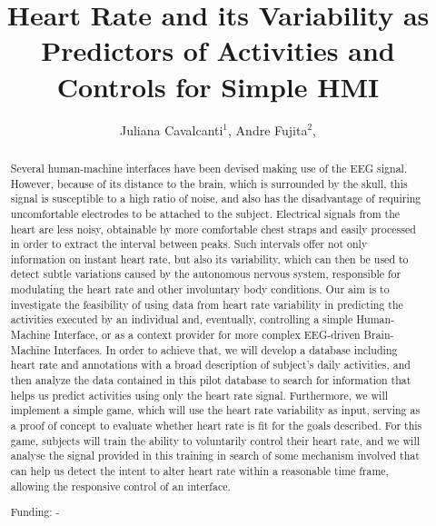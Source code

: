 \documentclass[twoside]{article}
\title{\vspace{-15mm}\fontsize{24pt}{10pt}\selectfont\textbf{ Heart Rate and its Variability as Predictors of Activities and Controls for Simple HMI }} %
\author{ Juliana Cavalcanti$^{1}$, Andre Fujita$^{2}$, }
\affil{ 1 Universidade de São Paulo

2 IME - USP

 }
\date{}
\begin{document}
  
  
  \maketitle %
  
  
  \thispagestyle{fancy} %
  
  
  \begin{abstract}
  Several human-machine interfaces have been devised making use of the EEG signal. However, because of its distance to the brain, which is surrounded by the skull, this signal is susceptible to a high ratio of noise, and also has the disadvantage of requiring uncomfortable electrodes to be attached to the subject.  Electrical signals from the heart are less noisy, obtainable by more comfortable chest straps and easily processed in order to extract the interval between peaks. Such intervals offer not only information on instant heart rate, but also its variability, which can then be used to detect subtle variations caused by the autonomous nervous system, responsible for modulating the heart rate and other involuntary body conditions. Our aim is to investigate the feasibility of using data from heart rate variability in predicting the activities executed by an individual and, eventually, controlling a simple Human-Machine Interface, or as a context provider for more complex EEG-driven Brain-Machine Interfaces.
In order to achieve that, we will develop a database including heart rate and annotations with a broad description of subject's daily activities, and then analyze the data contained in this pilot database to search for information that helps us predict activities using only the heart rate signal. Furthermore, we will implement a simple game, which will use the heart rate variability as input, serving as a proof of concept to evaluate whether heart rate is fit for the goals described. For this game, subjects will train the ability to voluntarily control  their heart rate, and we will analyse the signal provided in this training in search of some mechanism involved that can help us detect the intent to alter heart rate within a reasonable time frame,  allowing the responsive control of an interface.
  
  Funding: - \\ 
  \end{abstract}
  
\end{document}
